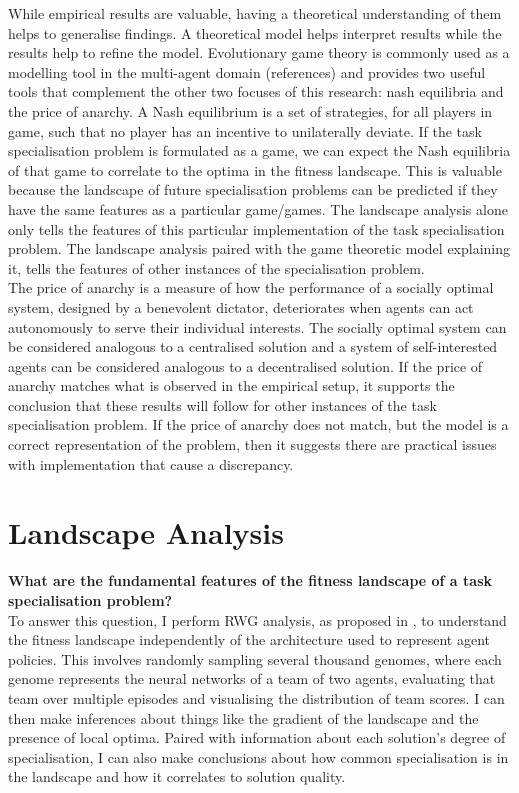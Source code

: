\documentclass[12pt]{article}
\begin{document}
\begin{description}
While empirical results are valuable, having a theoretical understanding of them helps to generalise findings.
A theoretical model helps interpret results while the results help to refine the model.
Evolutionary game theory is commonly used as a modelling tool in the multi-agent domain (references) and provides two useful tools that complement the other two focuses of this research: nash equilibria and the price of anarchy.
A Nash equilibrium is a set of strategies, for all players in game, such that no player has an incentive to unilaterally deviate.
If the task specialisation problem is formulated as a game, we can expect the Nash equilibria of that game to correlate to the optima in the fitness landscape.
This is valuable because the landscape of future specialisation problems can be predicted if they have the same features as a particular game/games.
The landscape analysis alone only tells the features of this particular implementation of the task specialisation problem.
The landscape analysis paired with the game theoretic model explaining it, tells the features of other instances of the specialisation problem.\\

The price of anarchy is a measure of how the performance of a socially optimal system, designed by a benevolent dictator, deteriorates when agents can act autonomously to serve their individual interests.
The socially optimal system can be considered analogous to a centralised solution and a system of self-interested agents can be considered analogous to a decentralised solution.
If the price of anarchy matches what is observed in the empirical setup, it supports the conclusion that these results will follow for other instances of the task specialisation problem.
If the price of anarchy does not match, but the model is a correct representation of the problem, then it suggests there are practical issues with implementation that cause a discrepancy.

\end{description}

\section{Landscape Analysis}\label{landscape_analysis}

\textbf{What are the fundamental features of the fitness landscape of a task specialisation problem?}\\

To answer this question, I perform RWG analysis, as proposed in \cite{oller:AAMAS:2020},  to understand the fitness landscape independently of the architecture used to represent agent policies.
This involves randomly sampling several thousand genomes, where each genome represents the neural networks of a team of two agents, evaluating that team over multiple episodes and visualising the distribution of team scores. 
I can then make inferences about things like the gradient of the landscape and the presence of local optima.
Paired with information about each solution's degree of specialisation, I can also make conclusions about how common specialisation is in the landscape and how it correlates to solution quality.\\
\end{document}
